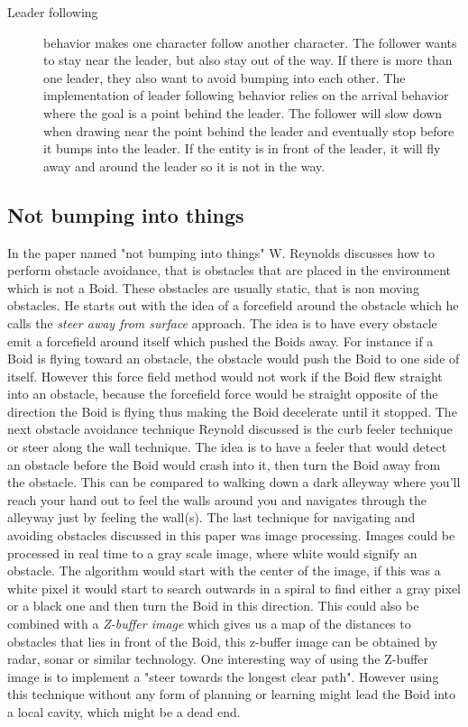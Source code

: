 \begin{description}
\item [Leader following] behavior makes one character follow another character. The follower wants to stay near the leader, but also stay out of the way. If there is more than one leader, they also want to avoid bumping into each other. The implementation of leader following behavior relies on the arrival behavior where the goal is a point behind the leader. The follower will slow down when drawing near the point behind the leader and eventually stop before it bumps into the leader. If the entity is in front of the leader, it will fly away and around the leader so it is not in the way.
\end{description}

\subsection{Not bumping into things}
In the paper named "not bumping into things" \cite{CraigW.Reynolds} W. Reynolds discusses how to perform obstacle avoidance, that is obstacles that are placed in the environment which is not a Boid. These obstacles are usually static, that is non moving obstacles. He starts out with the idea of a forcefield around the obstacle which he calls the \textit{steer away from surface} approach. The idea is to have every obstacle emit a forcefield around itself which pushed the Boids away. For instance if a Boid is flying toward an obstacle, the obstacle would push the Boid to one side of itself. However this force field method would not work if the Boid flew straight into an obstacle, because the forcefield force would be straight opposite of the direction the Boid is flying thus making the Boid decelerate until it stopped.
The next obstacle avoidance technique Reynold discussed is the curb feeler technique or steer along the wall technique. The idea is to have a feeler that would detect an obstacle before the Boid would crash into it, then turn the Boid away from the obstacle. This can be compared to walking down a dark alleyway where you'll reach your hand out to feel the walls around you and navigates through the alleyway just by feeling the wall(s).
The last technique for navigating and avoiding obstacles discussed in this paper \cite{CraigW.Reynolds} was image processing. Images could be processed in real time to a gray scale image, where white would signify an obstacle. The algorithm would start with the center of the image, if this was a white pixel it would start to search outwards in a spiral to find either a gray pixel or a black one and then turn the Boid in this direction. This could also be combined with a \textit{Z-buffer image} which gives us a map of the distances to obstacles that lies in front of the Boid, this z-buffer image can be obtained by radar, sonar or similar technology. One interesting way of using the Z-buffer image is to implement a "steer towards the longest clear path". However using this technique without any form of planning or learning might lead the Boid into a local cavity, which might be a dead end.

